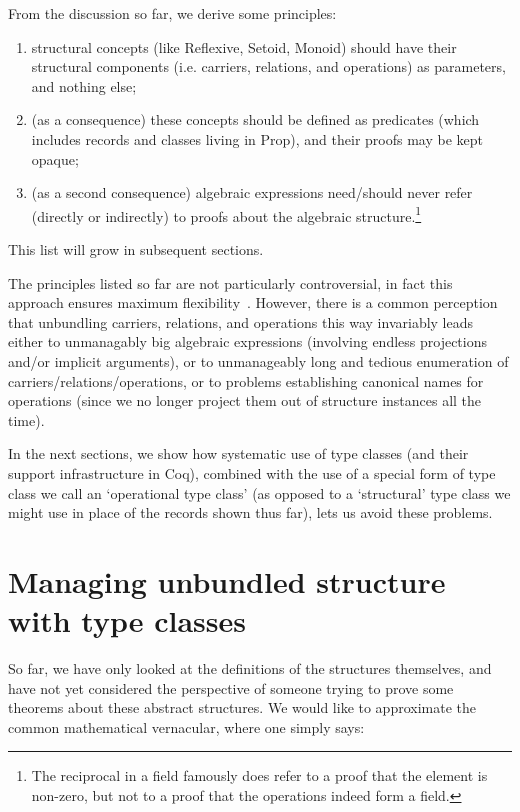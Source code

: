 \documentclass[a4paper,10pt, runningheads]{llncs}
\begin{document}
From the discussion so far, we derive some principles:
\begin{enumerate}
 \item structural concepts (like Reflexive, Setoid, Monoid) should have their structural components
(i.e. carriers, relations, and operations) as parameters, and nothing else;
 \item (as a consequence) these concepts should be defined as predicates (which includes records and
classes living in Prop), and their proofs may be kept opaque;
 \item (as a second consequence) algebraic expressions need/should never refer (directly or
indirectly) to proofs about the algebraic structure.\footnote{The reciprocal in a field
famously does refer to a proof that the element is non-zero, but not to a proof that the operations
indeed form a field.}
\end{enumerate}

This list will grow in subsequent sections.

The principles listed so far are not particularly controversial, in fact this
approach ensures maximum flexibility~\cite{Hints}. However,
there is a common perception that unbundling carriers, relations, and operations this way invariably
leads either to unmanagably big algebraic expressions (involving endless projections and/or implicit
arguments), or to unmanageably long and tedious enumeration of carriers/relations/operations, or to
problems establishing canonical names for operations (since we no longer project them out of
structure instances all the time).

In the next sections, we show how systematic use of type classes (and their support infrastructure
in Coq), combined with the use of a special form of type class we call an `operational type class'
(as opposed to a `structural' type class we might use in place of the records shown thus far), lets
us avoid these problems.

\section{Managing unbundled structure with type classes}

So far, we have only looked at the definitions of the structures themselves, and have not yet
considered the perspective of someone trying to prove some theorems about these abstract structures.
We would like to approximate the common mathematical vernacular, where one
simply says:
\end{document}
